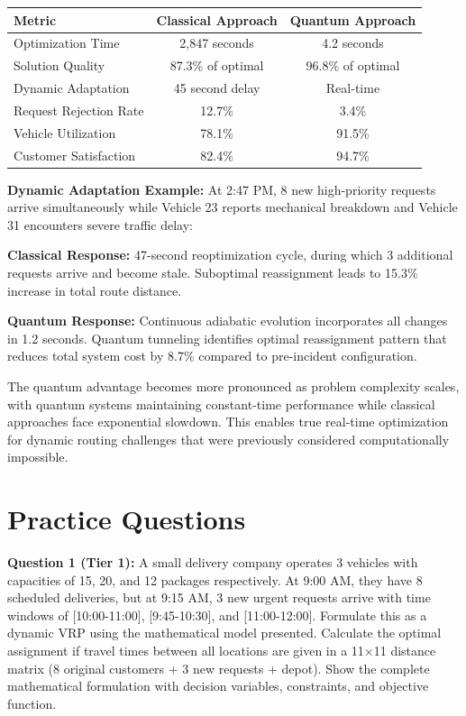 \documentclass{article}
\begin{document}
\begin{center}
\begin{tabular}{lcc}
\toprule
Metric & Classical Approach & Quantum Approach \\
\midrule
Optimization Time & 2,847 seconds & 4.2 seconds \\
Solution Quality & 87.3\% of optimal & 96.8\% of optimal \\
Dynamic Adaptation & 45 second delay & Real-time \\
Request Rejection Rate & 12.7\% & 3.4\% \\
Vehicle Utilization & 78.1\% & 91.5\% \\
Customer Satisfaction & 82.4\% & 94.7\% \\
\bottomrule
\end{tabular}
\end{center}

\textbf{Dynamic Adaptation Example:}
At 2:47 PM, 8 new high-priority requests arrive simultaneously while Vehicle 23 reports mechanical breakdown and Vehicle 31 encounters severe traffic delay:

\textbf{Classical Response:} 47-second reoptimization cycle, during which 3 additional requests arrive and become stale. Suboptimal reassignment leads to 15.3\% increase in total route distance.

\textbf{Quantum Response:} Continuous adiabatic evolution incorporates all changes in 1.2 seconds. Quantum tunneling identifies optimal reassignment pattern that reduces total system cost by 8.7\% compared to pre-incident configuration.

The quantum advantage becomes more pronounced as problem complexity scales, with quantum systems maintaining constant-time performance while classical approaches face exponential slowdown. This enables true real-time optimization for dynamic routing challenges that were previously considered computationally impossible.

\section{Practice Questions}

\textbf{Question 1 (Tier 1):} A small delivery company operates 3 vehicles with capacities of 15, 20, and 12 packages respectively. At 9:00 AM, they have 8 scheduled deliveries, but at 9:15 AM, 3 new urgent requests arrive with time windows of [10:00-11:00], [9:45-10:30], and [11:00-12:00]. Formulate this as a dynamic VRP using the mathematical model presented. Calculate the optimal assignment if travel times between all locations are given in a 11$\times$11 distance matrix (8 original customers + 3 new requests + depot). Show the complete mathematical formulation with decision variables, constraints, and objective function.
\end{document}
